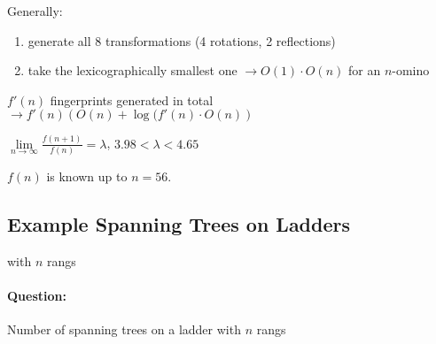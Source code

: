 \documentclass[11pt]{article}
\begin{document}
Generally:
\begin{enumerate}
\item generate all 8 transformations (4 rotations, 2 reflections)
\item take the lexicographically smallest one $ \rightarrow O(1) \cdot O(n) $ for an $ n $-omino
\end{enumerate}

$ f'(n) $ fingerprints generated in total $ \rightarrow f'(n)\left( O(n) + \log (f'(n) \cdot O(n) \right)$ \newline

$ \lim \limits_{n \rightarrow \infty} \frac{f ( n + 1)}{f(n)} = \lambda $, $ 3.98 < \lambda < 4.65 $ \newline

$ f(n) $ is known up to $ n = 56 $.




\subsection{Example Spanning Trees on Ladders}

with $ n $ rangs


\paragraph{Question:} Number of spanning trees on a ladder with $ n $ rangs
\end{document}
